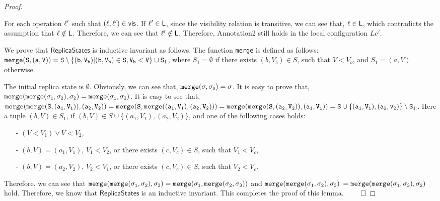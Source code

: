\begin {proof}
\begin{itemize}
\begin{itemize}
        For each operation $\ell'$ such that $(\ell,\ell') \in \mathsf{vis}$. If $\ell' \in \mathsf{L}$, since the visibility relation is transitive, we can see that, $\ell \in \mathsf{L}$, which contradicts the assumption that $\ell \notin \mathsf{L}$. Therefore, we can see that $\ell' \notin \mathsf{L}$. Therefore, Annotation2 still holds in the local configuration $Lc'$. 
    \end{itemize}
\end{itemize}

We prove that $\mathsf{ReplicaStates}$ is inductive invariant as follows. The function {\tt merge} is defined as follows: $\alabelshort[{\tt merge}]{S,(a,V)} = S \setminus \{ (b,V_b) \vert (b,V_b) \in S, V_b < V \} \cup S_1$, where $S_1 = \emptyset$ if there exists $(b,V_b) \in S$, such that $V < V_b$, and $S_1 = (a,V)$ otherwise.

The initial replica state is $\emptyset$. Obviously, we can see that, $\alabelshort[{\tt merge}]{\astate,\astate_0} = \astate$. It is easy to prove that, $\alabelshort[{\tt merge}]{\alabelshort[{\tt merge}]{\astate_1,\astate_2},\astate_2} = \alabelshort[{\tt merge}]{\astate_1,\astate_2}$. It is easy to see that, $\alabelshort[{\tt merge}]{\alabelshort[{\tt merge}]{S,(a_1,V_1)},(a_2,V_2)} = \alabelshort[{\tt merge}]{S, \alabelshort[{\tt merge}]{(a_1,V_1),(a_2,V_2)}} = \alabelshort[{\tt merge}]{\alabelshort[{\tt merge}]{S,(a_2,V_2)},(a_1,V_1)} = S \cup \{ (a_1,V_1),(a_2,v_2) \} \setminus S_1$. Here a tuple $(b,V) \in S_1$, if $(b,V) \in S \cup \{ (a_1,V_1),(a_2,V_2) \}$, and one of the following cases holds:

\begin{itemize}
\setlength{\itemsep}{0.5pt}
\item[-] $(V < V_1) \vee V < V_2$,

\item[-] $(b,V) = (a_1,V_1)$, $V_1 < V_2$, or there exists $(c,V_c) \in S$, such that $V_1 < V_c$,

\item[-] $(b,V) = (a_2,V_2)$, $V_2 < V_1$, or there exists $(c,V_c) \in S$, such that $V_2 < V_c$.
\end{itemize}

Therefore, we can see that $\alabelshort[{\tt merge}]{\alabelshort[{\tt merge}]{\astate_1,\astate_2},\astate_3} = \alabelshort[{\tt merge}]{\astate_1, \alabelshort[{\tt merge}]{\astate_2,\astate_3}}$ and $\alabelshort[{\tt merge}]{\alabelshort[{\tt merge}]{\astate_1,\astate_2},\astate_3}$ $= \alabelshort[{\tt merge}]{\alabelshort[{\tt merge}]{\astate_1,\astate_3},\astate_2}$ hold. Therefore, we know that $\mathsf{ReplicaStates}$ is an inductive invariant. This completes the proof of this lemma. $\qed$
\end {proof}






